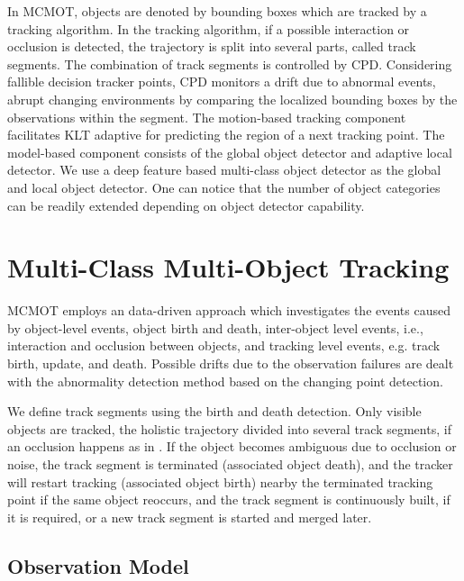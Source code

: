 \documentclass[runningheads]{llncs}
\begin{document}
In MCMOT, objects are denoted by bounding boxes which are tracked by a tracking algorithm. In the tracking algorithm, if a possible interaction or occlusion is detected, the trajectory is split into several parts, called track segments. The combination of track segments is controlled by CPD. Considering fallible decision tracker points, CPD monitors a drift due to abnormal events, abrupt changing environments by comparing the localized bounding boxes by the observations within the segment. The motion-based tracking component facilitates KLT \cite{Ref26} adaptive for predicting the region of a next tracking point. The model-based component consists of the global object detector and adaptive local detector. We use a deep feature based multi-class object detector \cite{Ref28} as the global and local object detector. One can notice that the number of object categories can be readily extended depending on object detector capability.

\section{Multi-Class Multi-Object Tracking}

MCMOT employs an data-driven approach which investigates the events caused by object-level events, object birth and death, inter-object level events, i.e., interaction and occlusion between objects, and tracking level events, e.g. track birth, update, and death. Possible drifts due to the observation failures are dealt with the abnormality detection method based on the changing point detection. 

We define track segments using the birth and death detection. Only visible objects are tracked, the holistic trajectory divided into several track segments, if an occlusion happens as in \cite{Ref16}. If the object becomes ambiguous due to occlusion or noise, the track segment is terminated (associated object death), and the tracker will restart tracking (associated object birth) nearby the terminated tracking point if the same object reoccurs, and the track segment is continuously built, if it is required, or a new track segment is started and merged later. 

\subsection{Observation Model}
\end{document}
